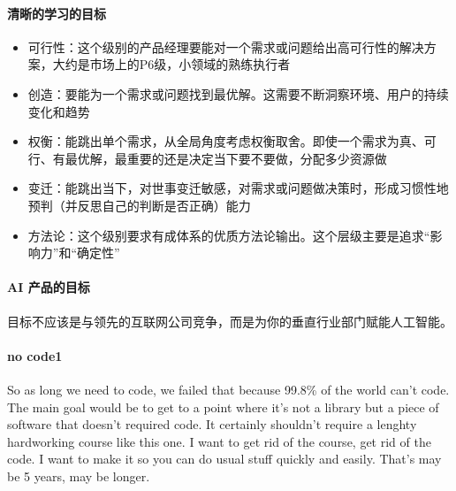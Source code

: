 \documentclass[letterpaper,11pt,english]{sphinxmanual}
\begin{document}
\paragraph{清晰的学习的目标}
\label{\detokenize{chapter_idea/goal:id8}}\begin{itemize}
\item {} 
可行性：这个级别的产品经理要能对一个需求或问题给出高可行性的解决方案，大约是市场上的P6级，小领域的熟练执行者

\item {} 
创造：要能为一个需求或问题找到最优解。这需要不断洞察环境、用户的持续变化和趋势

\item {} 
权衡：能跳出单个需求，从全局角度考虑权衡取舍。即使一个需求为真、可行、有最优解，最重要的还是决定当下要不要做，分配多少资源做

\item {} 
变迁：能跳出当下，对世事变迁敏感，对需求或问题做决策时，形成习惯性地预判（并反思自己的判断是否正确）能力

\item {} 
方法论：这个级别要求有成体系的优质方法论输出。这个层级主要是追求“影响力”和“确定性”

\end{itemize}


\paragraph{AI 产品的目标}
\label{\detokenize{chapter_idea/goal:ai}}
目标不应该是与领先的互联网公司竞争，而是为你的垂直行业部门赋能人工智能。
%
\begin{footnote}[357]\sphinxAtStartFootnote
{}
%
\end{footnote}


\paragraph{no code1\sphinxfootnotemark[358]}
\label{\detokenize{chapter_idea/goal:no-code1}}%
\begin{footnotetext}[358]\sphinxAtStartFootnote
{}
%
\end{footnotetext}\ignorespaces 
So as long we need to code, we failed that because 99.8\% of the world
can’t code. The main goal would be to get to a point where it’s not a
library but a piece of software that doesn’t required code. It certainly
shouldn’t require a lenghty hardworking course like this one. I want to
get rid of the course, get rid of the code. I want to make it so you can
do usual stuff quickly and easily. That’s may be 5 years, may be longer.
\end{document}
